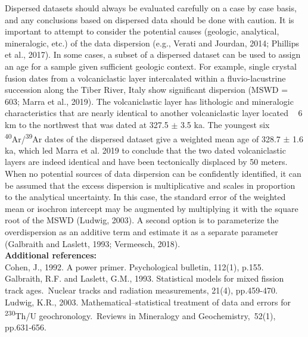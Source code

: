 \documentclass{article}
\begin{document}
Dispersed datasets should always be evaluated carefully on a case by
case basis, and any conclusions based on dispersed data should be done
with caution. It is important to attempt to consider the potential
causes (geologic, analytical, mineralogic, etc.) of the data
dispersion (e.g., Verati and Jourdan, 2014; Phillips et al., 2017). In
some cases, a subset of a dispersed dataset can be used to assign an
age for a sample given sufficient geologic context. For example,
single crystal fusion dates from a volcaniclastic layer intercalated
within a fluvio-lacustrine succession along the Tiber River, Italy
show significant dispersion (MSWD = 603; Marra et al., 2019). The
volcaniclastic layer has lithologic and mineralogic characteristics
that are nearly identical to another volcaniclastic layer located ~ 6
km to the northwest that was dated at 327.5 $\pm$ 3.5 ka. The youngest
six \textsuperscript{40}Ar/\textsuperscript{39}Ar dates of the
dispersed dataset give a weighted mean age of 328.7 $\pm$ 1.6 ka,
which led Marra et al. 2019 to conclude that the two dated
volcaniclastic layers are indeed identical and have been tectonically
displaced by 50 meters.\\

When no potential sources of data dispersion can be confidently
identified, it can be assumed that the excess dispersion is
multiplicative and scales in proportion to the analytical
uncertainty. In this case, the standard error of the weighted mean or
isochron intercept may be augmented by multiplying it with the square
root of the MSWD (Ludwig, 2003). A second option is to parameterize
the overdispersion as an additive term and estimate it as a separate
parameter (Galbraith and Laslett, 1993; Vermeesch, 2018).\\

\textbf{Additional references:}\\

Cohen, J., 1992. A power primer. Psychological bulletin, 112(1),
p.155.\\

Galbraith, R.F. and Laslett, G.M., 1993. Statistical models for mixed
fission track ages. Nuclear tracks and radiation measurements, 21(4),
pp.459-470.\\

Ludwig, K.R., 2003. Mathematical–statistical treatment of data and
errors for \textsuperscript{230}Th/U geochronology. Reviews in
Mineralogy and Geochemistry, 52(1), pp.631-656.\\
\end{document}

